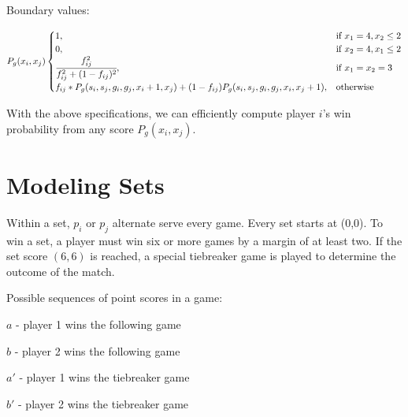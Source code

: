 \documentclass[chapterprefix=false]{report}
\begin{document}
Boundary values:

\begin{equation}
    P_g(x_i,x_j) 
    \begin{cases}
      1, & \text{if}\ x_1=4,x_2 \leq 2 \\
      0, & \text{if}\ x_2=4,x_1 \leq 2 \\
      \cfrac{f_{ij}^2}{f_{ij}^2+(1-f_{ij})^2}, & \text{if}\ x_1=x_2=3 \\
      f_{ij}*P_g(s_i,s_j,g_i,g_j,{x}_i+1,{x}_j) + (1-f_{ij}) P_g(s_i,s_j,g_i,g_j,{x}_i,{x}_j+1), & \text{otherwise}\ \\
      
    \end{cases}
  \end{equation}

With the above specifications, we can efficiently compute player $i$'s win probability from any score $P_g(x_i,x_j)$.

\section{Modeling Sets}

Within a set, $p_i$ or $p_j$ alternate serve every game. Every set starts at (0,0). To win a set, a player must win six or more games by a margin of at least two. If the set score $(6,6)$ is reached, a special tiebreaker game is played to determine the outcome of the match.

Possible sequences of point scores in a game:

$a$ - player 1 wins the following game

$b$ - player 2 wins the following game

$a'$ - player 1 wins the tiebreaker game

$b'$ - player 2 wins the tiebreaker game
\end{document}
